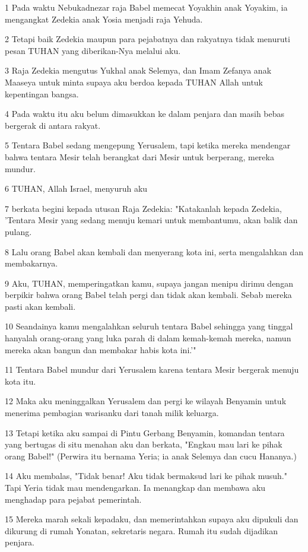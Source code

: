 \par 1 Pada waktu Nebukadnezar raja Babel memecat Yoyakhin anak Yoyakim, ia mengangkat Zedekia anak Yosia menjadi raja Yehuda.
\par 2 Tetapi baik Zedekia maupun para pejabatnya dan rakyatnya tidak menuruti pesan TUHAN yang diberikan-Nya melalui aku.
\par 3 Raja Zedekia mengutus Yukhal anak Selemya, dan Imam Zefanya anak Maaseya untuk minta supaya aku berdoa kepada TUHAN Allah untuk kepentingan bangsa.
\par 4 Pada waktu itu aku belum dimasukkan ke dalam penjara dan masih bebas bergerak di antara rakyat.
\par 5 Tentara Babel sedang mengepung Yerusalem, tapi ketika mereka mendengar bahwa tentara Mesir telah berangkat dari Mesir untuk berperang, mereka mundur.
\par 6 TUHAN, Allah Israel, menyuruh aku
\par 7 berkata begini kepada utusan Raja Zedekia: "Katakanlah kepada Zedekia, 'Tentara Mesir yang sedang menuju kemari untuk membantumu, akan balik dan pulang.
\par 8 Lalu orang Babel akan kembali dan menyerang kota ini, serta mengalahkan dan membakarnya.
\par 9 Aku, TUHAN, memperingatkan kamu, supaya jangan menipu dirimu dengan berpikir bahwa orang Babel telah pergi dan tidak akan kembali. Sebab mereka pasti akan kembali.
\par 10 Seandainya kamu mengalahkan seluruh tentara Babel sehingga yang tinggal hanyalah orang-orang yang luka parah di dalam kemah-kemah mereka, namun mereka akan bangun dan membakar habis kota ini.'"
\par 11 Tentara Babel mundur dari Yerusalem karena tentara Mesir bergerak menuju kota itu.
\par 12 Maka aku meninggalkan Yerusalem dan pergi ke wilayah Benyamin untuk menerima pembagian warisanku dari tanah milik keluarga.
\par 13 Tetapi ketika aku sampai di Pintu Gerbang Benyamin, komandan tentara yang bertugas di situ menahan aku dan berkata, "Engkau mau lari ke pihak orang Babel!" (Perwira itu bernama Yeria; ia anak Selemya dan cucu Hananya.)
\par 14 Aku membalas, "Tidak benar! Aku tidak bermaksud lari ke pihak musuh." Tapi Yeria tidak mau mendengarkan. Ia menangkap dan membawa aku menghadap para pejabat pemerintah.
\par 15 Mereka marah sekali kepadaku, dan memerintahkan supaya aku dipukuli dan dikurung di rumah Yonatan, sekretaris negara. Rumah itu sudah dijadikan penjara.
